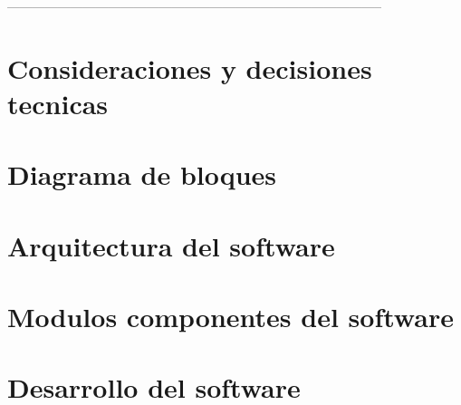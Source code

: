 -----------------------------------------------------------------------------------------

\section{Consideraciones y decisiones tecnicas}
\label{sec:consideraciones_decisiones_tecnicas}

\section{Diagrama de bloques}
\label{sec:diag_bloques}

\section{Arquitectura del software}
\label{sec:arquitectura_software}

\section{Modulos componentes del software}
\label{sec:modulos_componentes_software}


\section{Desarrollo del software}
\label{sec:desarrollo_software}

